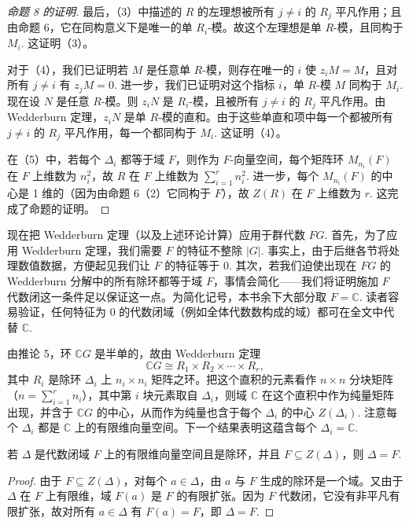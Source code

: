 \begin{proof}[命题 8 的证明]
最后，（3）中描述的 \(R\) 的左理想被所有 \(j \neq i\) 的 \(R_j\) 平凡作用；且由命题 6，它在同构意义下是唯一的单 \(R_i\)-模。故这个左理想是单 \(R\)-模，且同构于 \(M_i\). 这证明（3）。

对于（4），我们已证明若 \(M\) 是任意单 \(R\)-模，则存在唯一的 \(i\) 使 \(z_iM = M\)，且对所有 \(j \neq i\) 有 \(z_jM = 0\). 进一步，我们已证明对这个指标 \(i\)，单 \(R\)-模 \(M\) 同构于 \(M_i\). 现在设 \(N\) 是任意 \(R\)-模。则 \(z_iN\) 是 \(R_i\)-模，且被所有 \(j \neq i\) 的 \(R_j\) 平凡作用。由 Wedderburn 定理，\(z_iN\) 是单 \(R\)-模的直和。由于这些单直和项中每一个都被所有 \(j \neq i\) 的 \(R_j\) 平凡作用，每一个都同构于 \(M_i\). 这证明（4）。

在（5）中，若每个 \(\Delta_i\) 都等于域 \(F\)，则作为 \(F\)-向量空间，每个矩阵环 \(M_{n_i}(F)\) 在 \(F\) 上维数为 \(n_i^2\)，故 \(R\) 在 \(F\) 上维数为 \(\sum_{i=1}^{r}n_i^2\). 进一步，每个 \(M_{n_i}(F)\) 的中心是 1 维的（因为由命题 6（2）它同构于 \(F\)），故 \(Z(R)\) 在 \(F\) 上维数为 \(r\). 这完成了命题的证明。
\end{proof}

现在把 Wedderburn 定理（以及上述环论计算）应用于群代数 \(FG\). 首先，为了应用 Wedderburn 定理，我们需要 \(F\) 的特征不整除 \(|G|\). 事实上，由于后继各节将处理数值数据，方便起见我们让 \(F\) 的特征等于 0. 其次，若我们迫使出现在 \(FG\) 的 Wedderburn 分解中的所有除环都等于域 \(F\)，事情会简化——我们将证明施加 \(F\) 代数闭这一条件足以保证这一点。为简化记号，本书余下大部分取 \(F = \mathbb{C}\). 读者容易验证，任何特征为 0 的代数闭域（例如全体代数数构成的域）都可在全文中代替 \(\mathbb{C}\).

由推论 5，环 \(\mathbb{C}G\) 是半单的，故由 Wedderburn 定理
\[
\mathbb{C}G \cong R_1 \times R_2 \times \cdots \times R_r,
\]
其中 \(R_i\) 是除环 \(\Delta_i\) 上 \(n_i \times n_i\) 矩阵之环。把这个直积的元素看作 \(n \times n\) 分块矩阵（\(n = \sum_{i=1}^{r}n_i\)），其中第 \(i\) 块元素取自 \(\Delta_i\)，则域 \(\mathbb{C}\) 在这个直积中作为纯量矩阵出现，并含于 \(\mathbb{C}G\) 的中心，从而作为纯量也含于每个 \(\Delta_i\) 的中心 \(Z(\Delta_i)\). 注意每个 \(\Delta_i\) 都是 \(\mathbb{C}\) 上的有限维向量空间。下一个结果表明这蕴含每个 \(\Delta_i = \mathbb{C}\).

\begin{proposition}\label{pro:18.9}
若 \(\Delta\) 是代数闭域 \(F\) 上的有限维向量空间且是除环，并且 \(F \subseteq Z(\Delta)\)，则 \(\Delta = F\).
\end{proposition}

\begin{proof}
由于 \(F \subseteq Z(\Delta)\)，对每个 \(a \in \Delta\)，由 \(a\) 与 \(F\) 生成的除环是一个域。又由于 \(\Delta\) 在 \(F\) 上有限维，域 \(F(a)\) 是 \(F\) 的有限扩张。因为 \(F\) 代数闭，它没有非平凡有限扩张，故对所有 \(a \in \Delta\) 有 \(F(a) = F\)，即 \(\Delta = F\).
\end{proof}

